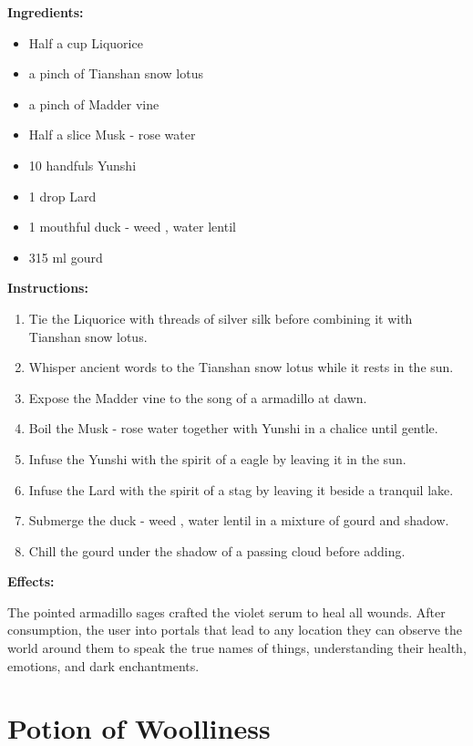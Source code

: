 \documentclass{article}
\begin{document}
\textbf{Ingredients:}

\begin{itemize}
  \item Half a cup Liquorice
  \item a pinch of Tianshan snow lotus
  \item a pinch of Madder vine
  \item Half a slice Musk - rose water
  \item 10 handfuls Yunshi
  \item 1 drop Lard
  \item 1 mouthful duck - weed , water lentil
  \item 315 ml gourd
\end{itemize}

\textbf{Instructions:}

\begin{enumerate}
  \item Tie the Liquorice with threads of silver silk before combining it with Tianshan snow lotus.
  \item Whisper ancient words to the Tianshan snow lotus while it rests in the sun.
  \item Expose the Madder vine to the song of a armadillo at dawn.
  \item Boil the Musk - rose water together with Yunshi in a chalice until gentle.
  \item Infuse the Yunshi with the spirit of a eagle by leaving it in the sun.
  \item Infuse the Lard with the spirit of a stag by leaving it beside a tranquil lake.
  \item Submerge the duck - weed , water lentil in a mixture of gourd and shadow.
  \item Chill the gourd under the shadow of a passing cloud before adding.
\end{enumerate}

\textbf{Effects:}

The pointed armadillo sages crafted the violet serum to heal all wounds. After consumption, the user into portals that lead to any location they can observe the world around them to speak the true names of things, understanding their health, emotions, and dark enchantments.

\newpage
\section*{Potion of Woolliness}
\end{document}
